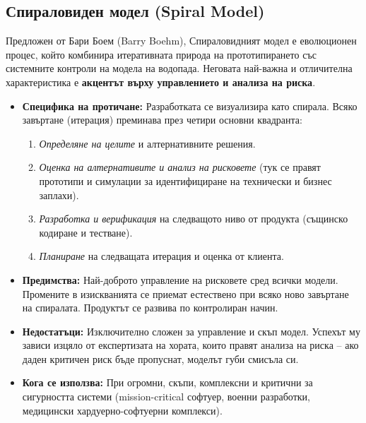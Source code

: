 \documentclass{scrartcl}
\begin{document}
\begin{FlushLeft}
\subsection{Спираловиден модел (Spiral Model)}
Предложен от Бари Боем (Barry Boehm), Спираловидният модел е еволюционен процес, който комбинира итеративната природа на прототипирането със системните контроли на модела на водопада. Неговата най-важна и отличителна характеристика е \textbf{акцентът върху управлението и анализа на риска}.
\begin{itemize}
    \item \textbf{Специфика на протичане:} Разработката се визуализира като спирала. Всяко завъртане (итерация) преминава през четири основни квадранта:
    \begin{enumerate}
        \item \emph{Определяне на целите} и алтернативните решения.
        \item \emph{Оценка на алтернативите и анализ на рисковете} (тук се правят прототипи и симулации за идентифициране на технически и бизнес заплахи).
        \item \emph{Разработка и верификация} на следващото ниво от продукта (същинско кодиране и тестване).
        \item \emph{Планиране} на следващата итерация и оценка от клиента.
    \end{enumerate}
    \item \textbf{Предимства:} Най-доброто управление на рисковете сред всички модели. Промените в изискванията се приемат естествено при всяко ново завъртане на спиралата. Продуктът се развива по контролиран начин.
    \item \textbf{Недостатъци:} Изключително сложен за управление и скъп модел. Успехът му зависи изцяло от експертизата на хората, които правят анализа на риска – ако даден критичен риск бъде пропуснат, моделът губи смисъла си.
    \item \textbf{Кога се използва:} При огромни, скъпи, комплексни и критични за сигурността системи (mission-critical софтуер, военни разработки, медицински хардуерно-софтуерни комплекси).
\end{itemize}


\end{FlushLeft}
\end{document}
